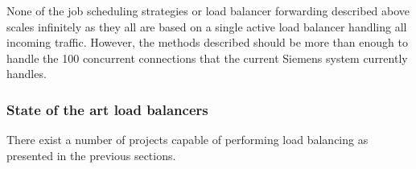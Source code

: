 None of the job scheduling strategies or load balancer forwarding described above scales infinitely as they all are based on a single active load balancer handling all incoming traffic. However, the methods described should be more than enough to handle the 100 concurrent connections that the current Siemens system currently handles. 


\subsubsection{State of the art load balancers}
There exist a number of projects capable of performing load balancing as presented in the previous sections.


